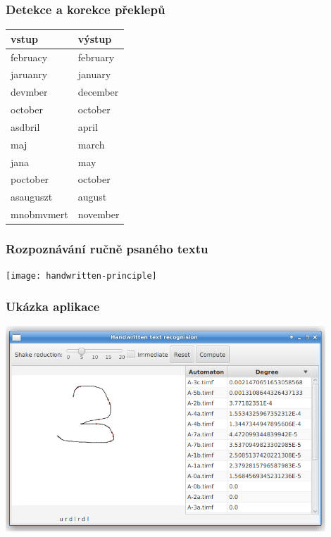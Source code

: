 \documentclass{beamer}
\begin{document}
\begin{frame}	%
\frametitle{Detekce a korekce překlepů}
\centering
\begin{tabular}{|l|l|}
 \hline
 vstup 			&	výstup	\\
 \hline
 februacy	 	& february	\\
 jaruanry		& january		\\
 devmber		 	& december	\\
 october			& october		\\
 asdbril			& april			\\
 maj					& march			\\
 jana				& may				\\
 poctober		& october		\\
 asauguszt		& august		\\
 mnobmvmert	& november 	\\
 \hline
\end{tabular}
\end{frame}

\begin{frame}	%
\frametitle{Rozpoznávání ručně psaného textu}
\centering
\texttt{[image: handwritten-principle]}
\end{frame}

\begin{frame}	%
\frametitle{Ukázka aplikace}
\centering
\includegraphics[width=0.9\textwidth]{handwritten-screen}
\end{frame}
\end{document}
